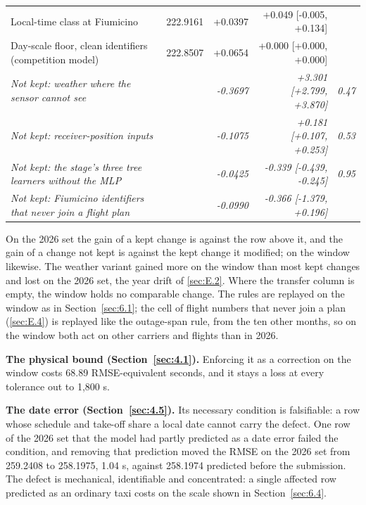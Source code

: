 \documentclass[
  manuscript=article,
  layout=preprint,
  year=2026,
  volume=x,
]{extra/joas}
\begin{document}
\begin{table}[htbp!]
\begin{tabularx}{\linewidth}{>{\raggedright\arraybackslash}Xrrrr}
  Local-time class at Fiumicino & 222.9161 & +0.0397 & +0.049 {[}-0.005, +0.134{]} &  \\
  Day-scale floor, clean identifiers (competition model) & 222.8507 & +0.0654 & +0.000 {[}+0.000, +0.000{]} &  \\
  \midrule
  \textit{Not kept: weather where the sensor cannot see} &  & \textit{-0.3697} & \textit{+3.301 {[}+2.799, +3.870{]}} & \textit{0.47} \\
  \textit{Not kept: receiver-position inputs} &  & \textit{-0.1075} & \textit{+0.181 {[}+0.107, +0.253{]}} & \textit{0.53} \\
  \textit{Not kept: the stage's three tree learners without the MLP} &  & \textit{-0.0425} & \textit{-0.339 {[}-0.439, -0.245{]}} & \textit{0.95} \\
  \textit{Not kept: Fiumicino identifiers that never join a flight plan} &  & \textit{-0.0990} & \textit{-0.366 {[}-1.379, +0.196{]}} &  \\
  \bottomrule
  \end{tabularx}
\end{table}

On the 2026 set the gain of a kept change is against the row above it, and the gain of a change not kept is against the kept change it modified; on the window likewise. The weather variant gained more on the window than most kept changes and lost on the 2026 set, the year drift of \ref{sec:E.2}. Where the transfer column is empty, the window holds no comparable change. The rules are replayed on the window as in Section~\ref{sec:6.1}; the cell of flight numbers that never join a plan (\ref{sec:E.4}) is replayed like the outage-span rule, from the ten other months, so on the window both act on other carriers and flights than in 2026.

\textbf{The physical bound (Section~\ref{sec:4.1}).} Enforcing it as a correction on the window costs 68.89 RMSE-equivalent seconds, and it stays a loss at every tolerance out to 1,800 s.

\textbf{The date error (Section~\ref{sec:4.5}).} Its necessary condition is falsifiable: a row whose schedule and take-off share a local date cannot carry the defect. One row of the 2026 set that the model had partly predicted as a date error failed the condition, and removing that prediction moved the RMSE on the 2026 set from 259.2408 to 258.1975, 1.04 s, against 258.1974 predicted before the submission. The defect is mechanical, identifiable and concentrated: a single affected row predicted as an ordinary taxi costs on the scale shown in Section~\ref{sec:6.4}.
\end{document}
